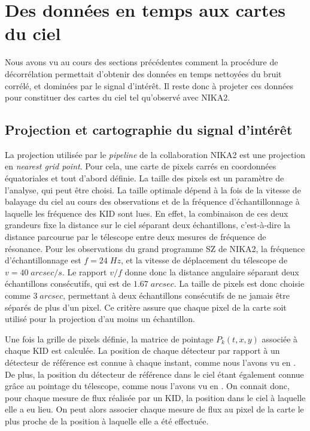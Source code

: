 \section{Des données en temps aux cartes du ciel}\label{sec:projec_toi}

Nous avons vu au cours des sections précédentes comment la procédure de décorrélation permettait d'obtenir des données en temps nettoyées du bruit corrélé, et dominées par le signal d'intérêt.
Il reste donc à projeter ces données pour constituer des cartes du ciel tel qu'observé avec NIKA2.

\subsection{Projection et cartographie du signal d'intérêt}

La projection utilisée par le \textit{pipeline} de la collaboration NIKA2 est une projection en \textit{nearest grid point}.
Pour cela, une carte de pixels carrés en coordonnées équatoriales et tout d'abord définie.
La taille des pixels est un paramètre de l'analyse, qui peut être choisi.
La taille optimale dépend à la fois de la vitesse de balayage du ciel au cours des observations et de la fréquence d'échantillonnage à laquelle les fréquence des KID sont lues.
En effet, la combinaison de ces deux grandeurs fixe la distance sur le ciel séparant deux échantillons, c'est-à-dire la distance parcourue par le télescope entre deux mesures de fréquence de résonance.
Pour les observations du grand programme SZ de NIKA2, la fréquence d'échantillonnage est $f = 24 \;\unit{Hz}$, et la vitesse de déplacement du télescope de $v = 40 \;\unit{arcsec/s}$.
Le rapport $v/f$ donne donc la distance angulaire séparant deux échantillons consécutifs, qui est de $1.67 \;\unit{arcsec}$.
La taille de pixels est donc choisie comme $3 \;\unit{arcsec}$, permettant à deux échantillons consécutifs de ne jamais être séparés de plus d'un pixel.
Ce critère assure que chaque pixel de la carte soit utilisé pour la projection d'au moins un échantillon.

Une fois la grille de pixels définie, la matrice de pointage $P_k(t, x, y)$ associée à chaque KID est calculée.
La position de chaque détecteur par rapport à un détecteur de référence est connue à chaque instant, comme nous l'avons vu en .
De plus, la position du détecteur de référence dans le ciel étant également connue grâce au pointage du télescope, comme nous l'avons vu en .
On connait donc, pour chaque mesure de flux réalisée par un KID, la position dans le ciel à laquelle elle a eu lieu.
On peut alors associer chaque mesure de flux au pixel de la carte le plus proche de la position à laquelle elle a été effectuée.

